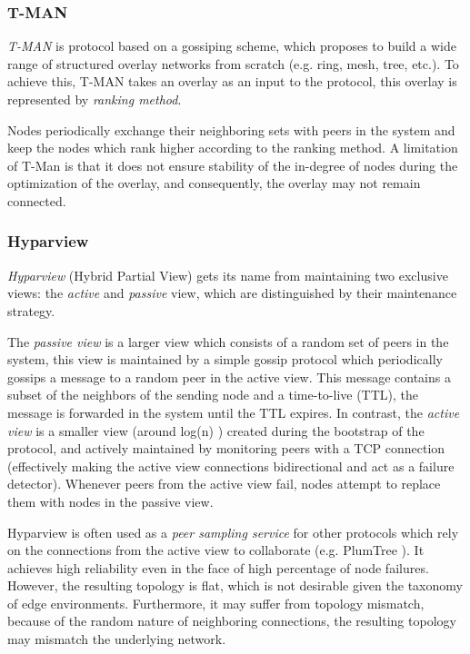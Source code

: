 \subsubsection*{T-MAN}

\textit{T-MAN} \cite{jelasity2005t} is protocol based on a gossiping scheme, which proposes to build a wide range of structured overlay networks from scratch (e.g. ring, mesh, tree, etc.). To achieve this, T-MAN takes an overlay as an input to the protocol, this overlay is represented by \textit{ranking method}. 

Nodes periodically exchange their neighboring sets with peers in the system and keep the nodes which rank higher according to the ranking method. A limitation of T-Man is that it does not ensure stability of the in-degree of nodes during the optimization of the overlay, and consequently, the overlay may not remain connected. 

\subsubsection*{Hyparview}

\textit{Hyparview} \cite{Hyparview} (Hybrid Partial View) gets its name from maintaining two exclusive views: the \textit{active} and \textit{passive} view, which are distinguished by their maintenance strategy. 

The \textit{passive view} is a larger view which consists of a random set of peers in the system, this view is maintained by a simple gossip protocol which periodically gossips a message to a random peer in the active view. This message contains a subset of the neighbors of the sending node and a time-to-live (TTL), the message is forwarded in the system until the TTL expires. In contrast, the \textit{active view} is a smaller view (around log(n) ) created during the bootstrap of the protocol, and actively maintained by monitoring peers with a TCP connection (effectively making the active view connections bidirectional and act as a failure detector). Whenever peers from the active view fail, nodes attempt to replace them with nodes in the passive view.

Hyparview is often used as a \textit{peer sampling service} for other protocols which rely on the connections from the active view to collaborate (e.g. PlumTree \cite{leitao2007epidemic}). It achieves high reliability even in the face of high percentage of node failures. However, the resulting topology is flat, which is not desirable given the taxonomy of edge environments. Furthermore, it may suffer from topology mismatch, because of the random nature of neighboring connections, the resulting topology may mismatch the underlying network.

